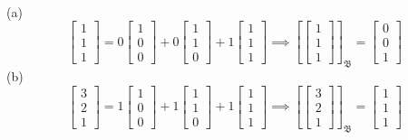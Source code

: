 \documentclass{report}
\begin{document}
\sol \\
(a)
$$
\left[\begin{array}{l} 1 \\ 1 \\ 1 \end{array}\right] =
0\left[\begin{array}{l} 1 \\0 \\ 0 \end{array}\right] +
0\left[\begin{array}{l} 1 \\ 1 \\ 0 \end{array}\right] +
1 \left[\begin{array}{l} 1 \\1 \\ 1 \end{array}\right] \implies
\left[\left[\begin{array}{l} 1 \\1 \\ 1 \end{array}\right]\right]_{\mathfrak{B}} = 
\left[\begin{array}{l} 0 \\0 \\ 1 \end{array}\right]
$$
(b)
$$
\left[\begin{array}{l} 3 \\ 2 \\ 1 \end{array}\right] =
1\left[\begin{array}{l} 1 \\0 \\ 0 \end{array}\right] +
1\left[\begin{array}{l} 1 \\ 1 \\ 0 \end{array}\right] +
1 \left[\begin{array}{l} 1 \\1 \\ 1 \end{array}\right] \implies
\left[\left[\begin{array}{l} 3 \\2 \\ 1 \end{array}\right]\right]_{\mathfrak{B}} = 
\left[\begin{array}{l} 1 \\1 \\ 1 \end{array}\right]
$$
\end{document}
